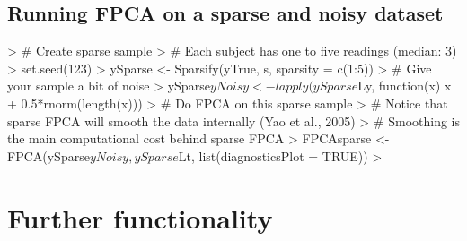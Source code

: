 \documentclass[11pt,english]{article}
\begin{document}
\subsection{Running FPCA on a sparse and noisy dataset }

\begin{Schunk}
\begin{Sinput}
>   # Create sparse sample  
>   # Each subject has one to five readings (median: 3)
>   set.seed(123)
>   ySparse <- Sparsify(yTrue, s, sparsity = c(1:5))
>   # Give your sample a bit of noise 
>   ySparse$yNoisy <- lapply(ySparse$Ly, function(x) x + 0.5*rnorm(length(x))) 
>   # Do FPCA on this sparse sample
>   # Notice that sparse FPCA will smooth the data internally (Yao et al., 2005)
>   # Smoothing is the main computational cost behind sparse FPCA
>   FPCAsparse <- FPCA(ySparse$yNoisy, ySparse$Lt, list(diagnosticsPlot = TRUE))  
>   
\end{Sinput}
\end{Schunk}


\section{Further functionality}

\end{document}
